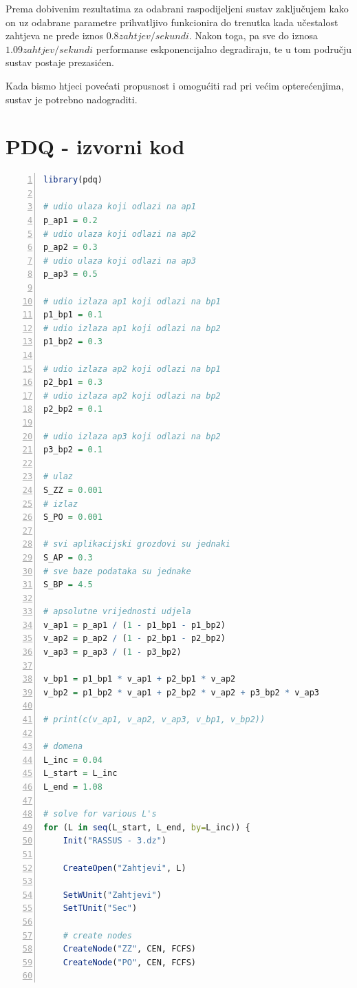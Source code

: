 \documentclass[11pt]{article}
\begin{document}
Prema dobivenim rezultatima za odabrani raspodijeljeni sustav zaključujem kako on uz odabrane parametre prihvatljivo funkcionira do trenutka kada učestalost zahtjeva ne pređe iznos $0.8 zahtjev / sekundi $. Nakon toga, pa sve do iznosa $1.09 zahtjev / sekundi$ performanse eskponencijalno degradiraju, te u tom području sustav postaje prezasićen.

Kada bismo htjeci povećati propusnost i omogućiti rad pri većim opterećenjima, sustav je potrebno nadograditi.


\newpage

\appendix
\section{PDQ - izvorni kod} \label{Dodatak A}

\begin{lstlisting}[caption=Izvorni kod u jeziku R, label=pdq_r, language=R, numbers=left]
library(pdq)

# udio ulaza koji odlazi na ap1
p_ap1 = 0.2
# udio ulaza koji odlazi na ap2
p_ap2 = 0.3
# udio ulaza koji odlazi na ap3
p_ap3 = 0.5

# udio izlaza ap1 koji odlazi na bp1
p1_bp1 = 0.1
# udio izlaza ap1 koji odlazi na bp2
p1_bp2 = 0.3

# udio izlaza ap2 koji odlazi na bp1
p2_bp1 = 0.3
# udio izlaza ap2 koji odlazi na bp2
p2_bp2 = 0.1

# udio izlaza ap3 koji odlazi na bp2
p3_bp2 = 0.1

# ulaz
S_ZZ = 0.001
# izlaz
S_PO = 0.001

# svi aplikacijski grozdovi su jednaki
S_AP = 0.3
# sve baze podataka su jednake
S_BP = 4.5

# apsolutne vrijednosti udjela
v_ap1 = p_ap1 / (1 - p1_bp1 - p1_bp2)
v_ap2 = p_ap2 / (1 - p2_bp1 - p2_bp2)
v_ap3 = p_ap3 / (1 - p3_bp2)

v_bp1 = p1_bp1 * v_ap1 + p2_bp1 * v_ap2
v_bp2 = p1_bp2 * v_ap1 + p2_bp2 * v_ap2 + p3_bp2 * v_ap3

# print(c(v_ap1, v_ap2, v_ap3, v_bp1, v_bp2))

# domena
L_inc = 0.04
L_start = L_inc
L_end = 1.08

# solve for various L's 
for (L in seq(L_start, L_end, by=L_inc)) {
	Init("RASSUS - 3.dz")
	
	CreateOpen("Zahtjevi", L)
	
	SetWUnit("Zahtjevi")
	SetTUnit("Sec")
	
	# create nodes
	CreateNode("ZZ", CEN, FCFS)
	CreateNode("PO", CEN, FCFS)
	

\end{lstlisting}
\end{document}
